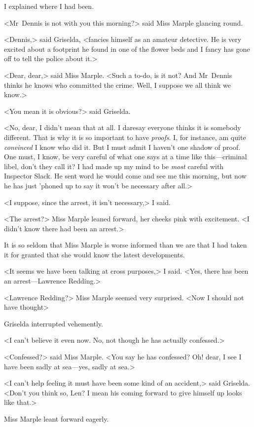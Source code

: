 I explained where I had been.

<Mr~Dennis is not with you this morning?> said Miss Marple glancing round.

<Dennis,> said Griselda, <fancies himself as an amateur detective. He is very excited about a footprint he found in one of the flower beds and I fancy has gone off to tell the police about it.>

<Dear, dear,> said Miss Marple. <Such a to-do, is it not? And Mr~Dennis thinks he knows who committed the crime. Well, I suppose we all think we know.>

<You mean it is obvious?> said Griselda.

<No, dear, I didn't mean that at all. I daresay everyone thinks it is somebody different. That is why it is so important to have \emph{proofs}. I, for instance, am quite \emph{convinced} I know who did it. But I must admit I haven't one shadow of proof. One must, I know, be very careful of what one says at a time like this—criminal libel, don't they call it? I had made up my mind to be \emph{most} careful with Inspector Slack. He sent word he would come and see me this morning, but now he has just 'phoned up to say it won't be necessary after all.>

<I suppose, since the arrest, it isn't necessary,> I said.

<The arrest?> Miss Marple leaned forward, her cheeks pink with excitement. <I didn't know there had been an arrest.>

It is so seldom that Miss Marple is worse informed than we are that I had taken it for granted that she would know the latest developments.

<It seems we have been talking at cross purposes,> I said. <Yes, there has been an arrest—Lawrence Redding.>

<Lawrence Redding?> Miss Marple seemed very surprised. <Now I should not have thought\longdash>

Griselda interrupted vehemently.

<I can't believe it even now. No, not though he has actually confessed.>

<Confessed?> said Miss Marple. <You say he has confessed? Oh! dear, I see I have been sadly at sea—yes, sadly at sea.>

<I can't help feeling it must have been some kind of an accident,> said Griselda. <Don't you think so, Len? I mean his coming forward to give himself up looks like that.>

Miss Marple leant forward eagerly.

